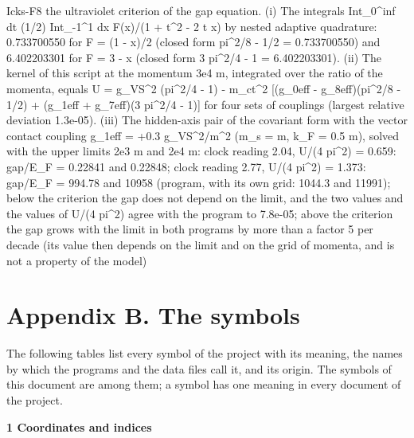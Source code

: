 \documentclass[
  10pt,
]{article}
\newenvironment{Shaded}{}{}
\newcommand{\NormalTok}[1]{#1}
\begin{document}
\begin{Shaded}
\begin{Highlighting}[]
\NormalTok{[PASS] Icks{-}F8  the ultraviolet criterion of the gap equation. (i) The integrals Int\_0\^{}inf dt (1/2) Int\_{-}1\^{}1 dx F(x)/(1 + t\^{}2 {-} 2 t x) by nested adaptive quadrature: 0.733700550 for F = (1 {-} x)/2 (closed form pi\^{}2/8 {-} 1/2 = 0.733700550) and 6.402203301 for F = 3 {-} x (closed form 3 pi\^{}2/4 {-} 1 = 6.402203301). (ii) The kernel of this script at the momentum 3e4 m, integrated over the ratio of the momenta, equals U = g\_VS\^{}2 (pi\^{}2/4 {-} 1) {-} m\_ct\^{}2 [(g\_0eff {-} g\_8eff)(pi\^{}2/8 {-} 1/2) + (g\_1eff + g\_7eff)(3 pi\^{}2/4 {-} 1)] for four sets of couplings (largest relative deviation 1.3e{-}05). (iii) The hidden{-}axis pair of the covariant form with the vector contact coupling g\_1eff = +0.3 g\_VS\^{}2/m\^{}2 (m\_s = m, k\_F = 0.5 m), solved with the upper limits 2e3 m and 2e4 m: clock reading 2.04, U/(4 pi\^{}2) = 0.659: gap/E\_F = 0.22841 and 0.22848; clock reading 2.77, U/(4 pi\^{}2) = 1.373: gap/E\_F = 994.78 and 10958 (program, with its own grid: 1044.3 and 11991); below the criterion the gap does not depend on the limit, and the two values and the values of U/(4 pi\^{}2) agree with the program to 7.8e{-}05; above the criterion the gap grows with the limit in both programs by more than a factor 5 per decade (its value then depends on the limit and on the grid of momenta, and is not a property of the model)}
\end{Highlighting}
\end{Shaded}

\hypertarget{appendix-b.-the-symbols}{%
\section{Appendix B. The symbols}\label{appendix-b.-the-symbols}}

The following tables list every symbol of the project with its meaning,
the names by which the programs and the data files call it, and its
origin. The symbols of this document are among them; a symbol has one
meaning in every document of the project.

\textbf{1 Coordinates and indices}
\end{document}

